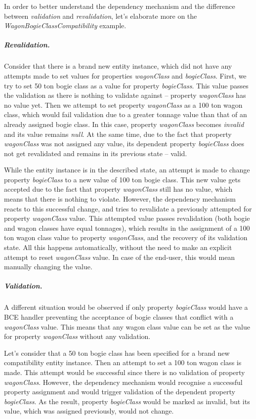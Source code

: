   In order to better understand the dependency mechanism and the difference between \emph{validation} and \emph{revalidation}, let's elaborate more on the \emph{WagonBogieClassCompatibility} example.
  
  \subparagraph*{Revalidation.}
  Consider that there is a brand new entity instance, which did not have any attempts made to set values for properties \emph{wagonClass} and \emph{bogieClass}.
  First, we try to set 50 ton bogie class as a value for property \emph{bogieClass}.
  This value passes the validation as there is nothing to validate against -- property \emph{wagonClass} has no value yet.
  Then we attempt to set property \emph{wagonClass} as a 100 ton wagon class, which would fail validation due to a greater tonnage value than that of an already assigned bogie class.
  In this case, property \emph{wagonClass} becomes \emph{invalid} and its value remains \emph{null}.
  At the same time, due to the fact that property \emph{wagonClass} was not assigned any value, its dependent property \emph{bogieClass} does not get revalidated and remains in its previous state -- valid.
 
  While the entity instance is in the described state, an attempt is made to change property \emph{bogieClass} to a new value of 100 ton bogie class.
  This new value gets accepted due to the fact that property \emph{wagonClass} still has no value, which means that there is nothing to violate.
  However, the dependency mechanism reacts to this successful change, and tries to revalidate a previously attempted for property \emph{wagonClass} value.
  This attempted value passes revalidation (both bogie and wagon classes have equal tonnages), which results in the assignment of a 100 ton wagon class value to property \emph{wagonClass}, and the recovery of its validation state.
  All this happens automatically, without the need to make an explicit attempt to reset \emph{wagonClass} value.
  In case of the end-user, this would mean manually changing the value.

  \subparagraph*{Validation.}
  A different situation would be observed if only property \emph{bogieClass} would have a BCE handler preventing the acceptance of bogie classes that conflict with a \emph{wagonClass} value.
  This means that any wagon class value can be set as the value for property \emph{wagonClass} without any validation.
  
  Let's consider that a 50 ton bogie class has been specified for a brand new compatibility entity instance.
  Then an attempt to set a 100 ton wagon class is made.
  This attempt would be successful since there is no validation of property \emph{wagonClass}.
  However, the dependency mechanism would recognise a successful property assignment and would trigger validation of the dependent property \emph{bogieClass}.
  As the result, property \emph{bogieClass} would be marked as invalid, but its value, which was assigned previously, would not change.
  

